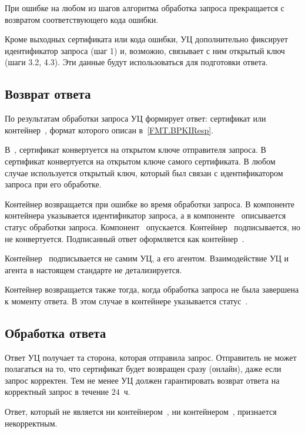 При ошибке на любом из шагов алгоритма обработка запроса прекращается с
возвратом соответствующего кода ошибки.

Кроме выходных сертификата или кода ошибки, УЦ дополнительно фиксирует
идентификатор запроса (шаг 1) и, возможно, связывает с ним открытый ключ 
(шаги 3.2, 4.3). Эти данные будут использоваться для подготовки ответа.

\subsection{Возврат ответа}\label{PROCESSES.Enroll.Resp}

По результатам обработки запроса УЦ формирует ответ: сертификат или
контейнер~, формат которого описан в~\ref{FMT.BPKIResp}.

В~,  сертификат конвертуется на открытом ключе
отправителя запроса. В~ сертификат конвертуется на открытом ключе
самого сертификата.
%
В любом случае используется открытый ключ, который был связан с идентификатором
запроса при его обработке.

Контейнер  возвращается при ошибке во время обработки запроса. В
компоненте~ контейнера указывается идентификатор запроса, а в
компоненте~ описывается статус обработки запроса.
Компонент~ опускается.
%
Контейнер~ подписывается, но не конвертуется.
%
Подписанный ответ оформляется как контейнер~.

Контейнер~ подписывается не самим УЦ, а его агентом.
Взаимодействие УЦ и агента в настоящем стандарте не детализируется.

Контейнер  возвращается также тогда, когда обработка запроса не
была завершена к моменту ответа. В этом случае в контейнере указывается
статус~.

\subsection{Обработка ответа}\label{PROCESSES.Enroll.Finish}

Ответ УЦ получает та сторона, которая отправила запрос. Отправитель не может
полагаться на то, что сертификат будет возвращен сразу (онлайн), даже если
запрос корректен.
%
Тем не менее УЦ должен гарантировать возврат ответа на корректный запрос  в
течение $24$~ч.

Ответ, который не является ни контейнером~, ни
контейнером~, признается некорректным.

